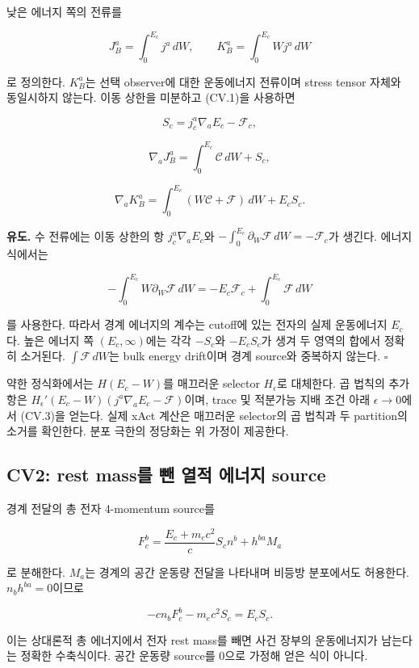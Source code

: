 낮은 에너지 쪽의 전류를

\[
J_B^a=\int_0^{E_c}j^a\,dW,\qquad
K_B^a=\int_0^{E_c}Wj^a\,dW
\tag{CV.2}
\]

로 정의한다. \(K_B^a\)는 선택 observer에 대한 운동에너지 전류이며 stress tensor 자체와 동일시하지 않는다. 이동 상한을 미분하고 (CV.1)을 사용하면

\[
\boxed{S_c=j_c^a\nabla_aE_c-\mathcal F_c,}
\tag{CV.3}
\]

\[
\boxed{\nabla_aJ_B^a=\int_0^{E_c}\mathcal C\,dW+S_c,}
\tag{CV.4}
\]

\[
\boxed{\nabla_aK_B^a=\int_0^{E_c}(W\mathcal C+\mathcal F)\,dW+E_cS_c.}
\tag{CV.5}
\]

\textbf{유도.} 수 전류에는 이동 상한의 항 \(j_c^a\nabla_aE_c\)와 \(-\int_0^{E_c}\partial_W\mathcal F\,dW=-\mathcal F_c\)가 생긴다. 에너지 식에서는

\[
-\int_0^{E_c}W\partial_W\mathcal F\,dW
=-E_c\mathcal F_c+\int_0^{E_c}\mathcal F\,dW
\]

를 사용한다. 따라서 경계 에너지의 계수는 cutoff에 있는 전자의 실제 운동에너지 \(E_c\)다. 높은 에너지 쪽 \((E_c,\infty)\)에는 각각 \(-S_c\)와 \(-E_cS_c\)가 생겨 두 영역의 합에서 정확히 소거된다. \(\int\mathcal F\,dW\)는 bulk energy drift이며 경계 source와 중복하지 않는다. \(\square\)

약한 정식화에서는 \(H(E_c-W)\)를 매끄러운 selector \(H_\epsilon\)로 대체한다. 곱 법칙의 추가 항은 \(H_\epsilon'(E_c-W)(j^a\nabla_aE_c-\mathcal F)\)이며, trace 및 적분가능 지배 조건 아래 \(\epsilon\to0\)에서 (CV.3)을 얻는다. 실제 xAct 계산은 매끄러운 selector의 곱 법칙과 두 partition의 소거를 확인한다. 분포 극한의 정당화는 위 가정이 제공한다.

\hypertarget{cv2-rest-massuxb97c-uxbe80-uxc5f4uxc801-uxc5d0uxb108uxc9c0-source}{%
\subsection{CV2: rest mass를 뺀 열적 에너지 source}\label{cv2-rest-massuxb97c-uxbe80-uxc5f4uxc801-uxc5d0uxb108uxc9c0-source}}

경계 전달의 총 전자 4-momentum source를

\[
F_c^b=\frac{E_c+m_ec^2}{c}S_c n^b+h^{ba}M_a
\tag{CV.6}
\]

로 분해한다. \(M_a\)는 경계의 공간 운동량 전달을 나타내며 비등방 분포에서도 허용한다. \(n_bh^{ba}=0\)이므로

\[
\boxed{-c n_bF_c^b-m_ec^2S_c=E_cS_c.}
\tag{CV.7}
\]

이는 상대론적 총 에너지에서 전자 rest mass를 빼면 사건 장부의 운동에너지가 남는다는 정확한 수축식이다. 공간 운동량 source를 0으로 가정해 얻은 식이 아니다.

